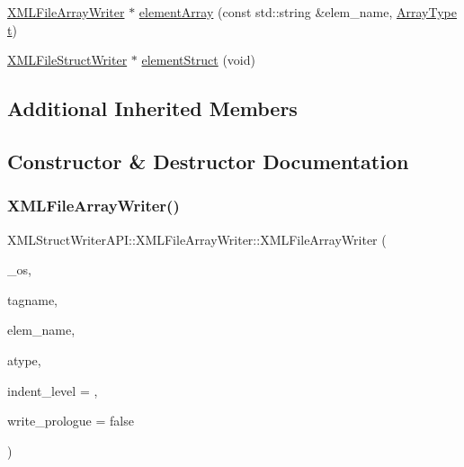 \begin{DoxyCompactItemize}
\item 
\mbox{\hyperlink{classXMLStructWriterAPI_1_1XMLFileArrayWriter}{X\+M\+L\+File\+Array\+Writer}} $\ast$ \mbox{\hyperlink{classXMLStructWriterAPI_1_1XMLFileArrayWriter_ad455da07ae5725cffdab8b056681ec2d}{element\+Array}} (const std\+::string \&elem\+\_\+name, \mbox{\hyperlink{namespaceXMLStructWriterAPI_a2017208be87c77a32bdc19ea2f14d032}{Array\+Type}} \mbox{\hyperlink{adat__devel_2lib_2hadron_2hadron__timeslice_8cc_ac310d9181e916ba43604099aee272c71}{t}})
\item 
\mbox{\hyperlink{classXMLStructWriterAPI_1_1XMLFileStructWriter}{X\+M\+L\+File\+Struct\+Writer}} $\ast$ \mbox{\hyperlink{classXMLStructWriterAPI_1_1XMLFileArrayWriter_a53910cfce30307c3333d553b7f018e64}{element\+Struct}} (void)
\end{DoxyCompactItemize}
\subsection*{Additional Inherited Members}


\subsection{Constructor \& Destructor Documentation}
\mbox{\label{classXMLStructWriterAPI_1_1XMLFileArrayWriter_ab4591c76da7c7db03abe6a3e4cf0529a}} 
\subsubsection{\texorpdfstring{XMLFileArrayWriter()}{XMLFileArrayWriter()}\hspace{0.1cm}{\footnotesize\ttfamily [1/3]}}
{\footnotesize\ttfamily X\+M\+L\+Struct\+Writer\+A\+P\+I\+::\+X\+M\+L\+File\+Array\+Writer\+::\+X\+M\+L\+File\+Array\+Writer (\begin{DoxyParamCaption}\item[{std\+::ofstream \&}]{\+\_\+os,  }\item[{const std\+::string \&}]{tagname,  }\item[{const std\+::string \&}]{elem\+\_\+name,  }\item[{\mbox{\hyperlink{namespaceXMLStructWriterAPI_a2017208be87c77a32bdc19ea2f14d032}{Array\+Type}}}]{atype,  }\item[{int}]{indent\+\_\+level = {},  }\item[{bool}]{write\+\_\+prologue = {\ttfamily false} }\end{DoxyParamCaption})\hspace{0.3cm}{\ttfamily [inline]}}

